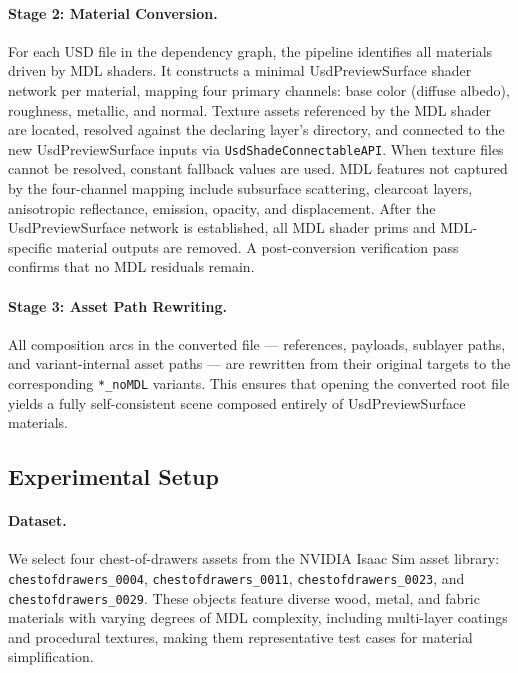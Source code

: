 \paragraph{Stage 2: Material Conversion.}
For each USD file in the dependency graph, the pipeline identifies all
materials driven by MDL shaders. It constructs a minimal UsdPreviewSurface
shader network per material, mapping four primary channels: base color (diffuse
albedo), roughness, metallic, and normal. Texture assets referenced by the MDL
shader are located, resolved against the declaring layer's directory, and
connected to the new UsdPreviewSurface inputs via \texttt{UsdShadeConnectableAPI}.
When texture files cannot be resolved, constant fallback values are used.
MDL features not captured by the four-channel mapping include subsurface
scattering, clearcoat layers, anisotropic reflectance, emission, opacity, and
displacement. After the UsdPreviewSurface network is established, all MDL shader prims and
MDL-specific material outputs are removed. A post-conversion verification pass
confirms that no MDL residuals remain.

\paragraph{Stage 3: Asset Path Rewriting.}
All composition arcs in the converted file --- references, payloads, sublayer
paths, and variant-internal asset paths --- are rewritten from their original
targets to the corresponding \texttt{*\_noMDL} variants. This ensures that
opening the converted root file yields a fully self-consistent scene composed
entirely of UsdPreviewSurface materials.

\subsection{Experimental Setup}
\label{sec:setup}

\paragraph{Dataset.}
We select four chest-of-drawers assets from the NVIDIA Isaac Sim asset library:
\texttt{chestofdrawers\_0004}, \texttt{chestofdrawers\_0011},
\texttt{chestofdrawers\_0023}, and \texttt{chestofdrawers\_0029}. These objects
feature diverse wood, metal, and fabric materials with varying degrees of MDL
complexity, including multi-layer coatings and procedural textures, making them
representative test cases for material simplification.

